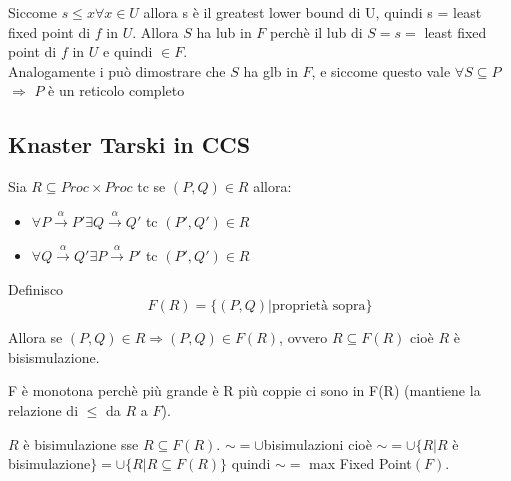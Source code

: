 \documentclass{article}
\newcommand{\passo}{\xrightarrow{\alpha}}
\begin{document}

Siccome $s \leq x \forall x \in U$ allora s è il greatest lower bound di U, quindi s = least fixed point di $f$ in $U$. Allora $S$ ha lub in $F$ perchè il lub di $S = s =$ least fixed point di $f$ in $U$ e quindi $\in F$.\\

Analogamente i può dimostrare che $S$ ha glb in $F$, e siccome questo vale $\forall S \subseteq P$ $\Rightarrow$ $P$ è un reticolo completo


\subsection{Knaster Tarski in CCS}

Sia $R \subseteq Proc \times Proc$ tc se $(P, Q) \in R$ allora:
\begin{itemize}
    \item $\forall P \passo P' \exists Q \passo Q'$ tc $(P', Q') \in R$
    \item $\forall Q \passo Q' \exists P \passo P'$ tc $(P', Q') \in R$
\end{itemize}

Definisco $$F(R) = \{ (P,Q) | \text{proprietà sopra} \} $$

Allora se $(P,Q) \in R \Rightarrow (P,Q) \in F(R)$, ovvero $R \subseteq F(R)$ cioè $R$ è bisismulazione.

F è monotona perchè più grande è R più coppie ci sono in F(R) (mantiene la relazione di $\leq$ da $R$ a $F$).

$R$ è bisimulazione sse $R \subseteq F(R)$. $ \sim= \cup$bisimulazioni cioè $\sim = \cup \{ R |R $ è bisimulazione$\} = \cup \{R | R \subseteq F(R)\} $ quindi $\sim = $ max Fixed Point$(F)$.
\end{document}
